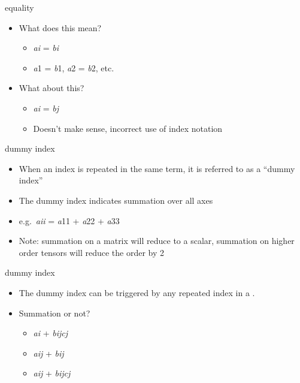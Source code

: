 \documentclass[
  letterpaper,
  ignorenonframetext,
  aspectratio=43,
  handout,
  12pt]{beamer}
\providecommand{\tightlist}{%
  \setlength{\itemsep}{0pt}\setlength{\parskip}{0pt}}
\providecommand{\tightlist}{%
\setlength{\itemsep}{0pt}\setlength{\parskip}{0pt}}
\begin{document}
\begin{frame}{equality}
\protect\hypertarget{equality}{}
\begin{itemize}
\tightlist
\item
  What does this mean?

  \begin{itemize}
  \item
    \emph{a}\emph{i} = \emph{b}\emph{i}
  \item
    \emph{a}1 = \emph{b}1, \emph{a}2 = \emph{b}2, etc.
  \end{itemize}
\item
  What about this?

  \begin{itemize}
  \item
    \emph{a}\emph{i} = \emph{b}\emph{j}
  \item
    Doesn't make sense, incorrect use of index notation
  \end{itemize}
\end{itemize}
\end{frame}

\begin{frame}{dummy index}
\protect\hypertarget{dummy-index}{}
\begin{itemize}
\tightlist
\item
  When an index is repeated in the same term, it is referred to as a
  ``dummy index''
\item
  The dummy index indicates summation over all axes
\item
  e.g.~\emph{a}\emph{ii} = \emph{a}11 + \emph{a}22 + \emph{a}33
\item
  Note: summation on a matrix will reduce to a scalar, summation on
  higher order tensors will reduce the order by 2
\end{itemize}
\end{frame}

\begin{frame}{dummy index}
\protect\hypertarget{dummy-index-1}{}
\begin{itemize}
\tightlist
\item
  The dummy index can be triggered by any repeated index in a .
\item
  Summation or not?

  \begin{itemize}
  \tightlist
  \item
    \emph{a}\emph{i} + \emph{b}\emph{ij}\emph{c}\emph{j}
  \item
    \emph{a}\emph{ij} + \emph{b}\emph{ij}
  \item
    \emph{a}\emph{ij} + \emph{b}\emph{ij}\emph{c}\emph{j}
  \end{itemize}
\end{itemize}
\end{frame}
\end{document}
